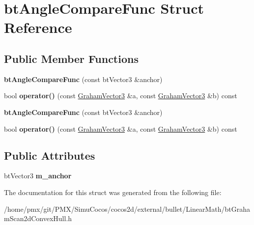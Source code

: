 \hypertarget{structbtAngleCompareFunc}{}\section{bt\+Angle\+Compare\+Func Struct Reference}
\label{structbtAngleCompareFunc}
\subsection*{Public Member Functions}
\begin{DoxyCompactItemize}
\item 
\mbox{\label{structbtAngleCompareFunc_ac63930a2d4fa6fb3bf94b33016df1933}} 
{\bfseries bt\+Angle\+Compare\+Func} (const bt\+Vector3 \&anchor)
\item 
\mbox{\label{structbtAngleCompareFunc_a317eee82a86ac766b77b24c010355be5}} 
bool {\bfseries operator()} (const \hyperlink{structGrahamVector3}{Graham\+Vector3} \&a, const \hyperlink{structGrahamVector3}{Graham\+Vector3} \&b) const
\item 
\mbox{\label{structbtAngleCompareFunc_ac63930a2d4fa6fb3bf94b33016df1933}} 
{\bfseries bt\+Angle\+Compare\+Func} (const bt\+Vector3 \&anchor)
\item 
\mbox{\label{structbtAngleCompareFunc_a317eee82a86ac766b77b24c010355be5}} 
bool {\bfseries operator()} (const \hyperlink{structGrahamVector3}{Graham\+Vector3} \&a, const \hyperlink{structGrahamVector3}{Graham\+Vector3} \&b) const
\end{DoxyCompactItemize}
\subsection*{Public Attributes}
\begin{DoxyCompactItemize}
\item 
\mbox{\label{structbtAngleCompareFunc_ad4af6de54547bbc4b8aceb9fc24fcff1}} 
bt\+Vector3 {\bfseries m\+\_\+anchor}
\end{DoxyCompactItemize}


The documentation for this struct was generated from the following file\+:\begin{DoxyCompactItemize}
\item 
/home/pmx/git/\+P\+M\+X/\+Simu\+Cocos/cocos2d/external/bullet/\+Linear\+Math/bt\+Graham\+Scan2d\+Convex\+Hull.\+h\end{DoxyCompactItemize}
